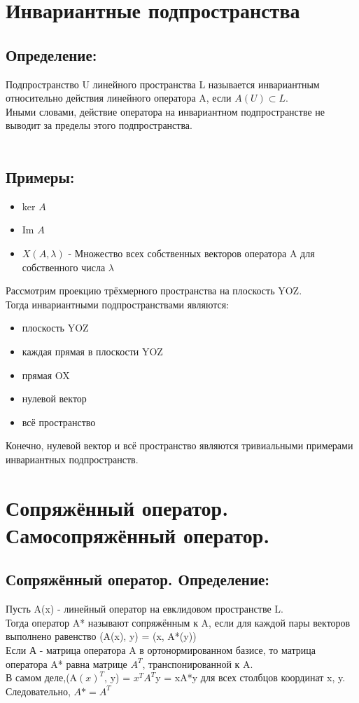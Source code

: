 \documentclass[12pt]{article}
\begin{document}
\section{Инвариантные подпространства}
\subsection{Определение:}

Подпространство U линейного пространства L называется инвариантным относительно действия линейного оператора A, если $A(U)  \subset  L$.\\
Иными словами, действие оператора на инвариантном подпространстве не выводит за пределы этого подпространства.\\\\
\subsection{Примеры:}
\begin{itemize}
    \item ker $A$
    \item Im $A$
    \item $X(A,\lambda)$ - Множество всех собственных векторов оператора A для собственного числа $\lambda$
\end{itemize}
Рассмотрим проекцию трёхмерного пространства на плоскость YOZ.\\
Тогда инвариантными подпространствами являются:
\begin{itemize}
    \item плоскость YOZ
    \item каждая прямая в плоскости YOZ
    \item прямая OX
    \item нулевой вектор
    \item всё пространство
\end{itemize}
Конечно, нулевой вектор и всё пространство являются тривиальными примерами инвариантных подпространств.

\section{Сопряжённый оператор. Самосопряжённый оператор.}
\subsection{Сопряжённый оператор. Определение:}
Пусть A(x) - линейный оператор на евклидовом пространстве L.\\
Тогда оператор A* называют сопряжённым к A, если для каждой пары векторов выполнено равенство (A(x), y) = (x, A*(y))\\
Если А - матрица оператора A  в ортонормированном базисе, то матрица оператора A* равна матрице $A^T$, транспонированной к A.\\
В самом деле,(A$(x)^{T}$, y) = $x^T$$A^T$y = xA*y для всех столбцов координат x, y. \\
    Следовательно, $A* = A^T$
\end{document}
